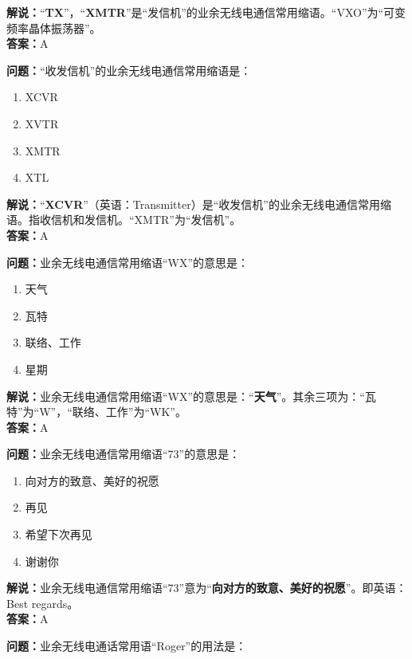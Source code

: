 \textbf{解说：}“\textbf{TX}”，“\textbf{XMTR}”是“发信机”的业余无线电通信常用缩语。“VXO”为“可变频率晶体振荡器”。\\\textbf{答案：}A



\textbf{问题：}“收发信机”的业余无线电通信常用缩语是：

\begin{enumerate}[label=\Alph*), leftmargin=1cm]
	\item XCVR
	\item XVTR
	\item XMTR
	\item XTL
\end{enumerate}

\textbf{解说：}“\textbf{XCVR}”（英语：Transmitter）是“收发信机”的业余无线电通信常用缩语。指收信机和发信机。“XMTR”为“发信机”。\\\textbf{答案：}A



\textbf{问题：}业余无线电通信常用缩语“WX”的意思是：

\begin{enumerate}[label=\Alph*), leftmargin=1cm]
	\item 天气
	\item 瓦特
	\item 联络、工作
	\item 星期
\end{enumerate}

\textbf{解说：}业余无线电通信常用缩语“WX”的意思是：“\textbf{天气}”。其余三项为：“瓦特”为“W”，“联络、工作”为“WK”。\\\textbf{答案：}A



\textbf{问题：}业余无线电通信常用缩语“73”的意思是：

\begin{enumerate}[label=\Alph*), leftmargin=1cm]
	\item 向对方的致意、美好的祝愿
	\item 再见
	\item 希望下次再见
	\item 谢谢你
\end{enumerate}

\textbf{解说：}业余无线电通信常用缩语“73”意为“\textbf{向对方的致意、美好的祝愿}”。即英语：Best regards。\\\textbf{答案：}A



\textbf{问题：}业余无线电通话常用语“Roger”的用法是：

